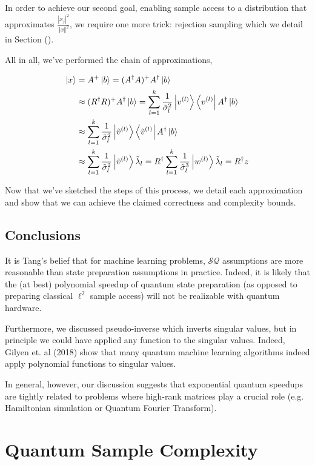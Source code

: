 \documentclass[main.tex]{subfiles}
\begin{document}
In order to achieve our second goal, enabling sample access to a distribution that approximates $\frac{|x_j|^2}{\Vert x \Vert^2}$, we require one more trick: rejection sampling which we detail in Section ().

All in all, we've performed the chain of approximations,

\begin{align*}
	\ket{x} &= A^+ \ket{b} = (A^\dag A)^+ A^\dag \ket{b}\\
	&\approx (R^\dag R)^+ A^\dag \ket{b} = \sum_{l = 1}^k \frac{1}{\tilde{\sigma}_l^2} \ket{v^{(l)}} \bra{v^{(l)}} A^\dag \ket{b}\\
	&\approx \sum_{l = 1}^k \frac{1}{\tilde{\sigma}_l^2} \ket{\tilde{v}^{(l)}} \bra{\tilde{v}^{(l)}} A^\dag \ket{b}\\ %
	&\approx \sum_{l = 1}^k \frac{1}{\tilde{\sigma}_l^2} \ket{\tilde{v}^{(l)}} \tilde{\lambda}_l = R^\dag \sum_{l = 1}^k \frac{1}{\tilde{\sigma}_l^3} \ket{w^{(l)}} \tilde{\lambda}_l = R^\dag z
\end{align*}


Now that we've sketched the steps of this process, we detail each approximation and show that we can achieve the claimed correctness and complexity bounds.


\section{Conclusions}

It is Tang's belief that for machine learning problems, $\mathcal{SQ}$ assumptions are more reasonable than state preparation assumptions in practice. Indeed, it is likely that the (at best) polynomial speedup of quantum state preparation (as opposed to preparing classical $\ell^2$ sample access) will not be realizable with quantum hardware.

Furthermore, we discussed pseudo-inverse which inverts singular values, but in principle we could have applied any function to the singular values. Indeed, Gilyen et. al (2018) show that many quantum machine learning algorithms indeed apply polynomial functions to singular values. 

In general, however, our discussion suggests that exponential quantum speedups are tightly related to problems where high-rank matrices play a crucial role (e.g. Hamiltonian simulation or Quantum Fourier Transform).

\chapter{Quantum Sample Complexity}
\end{document}
